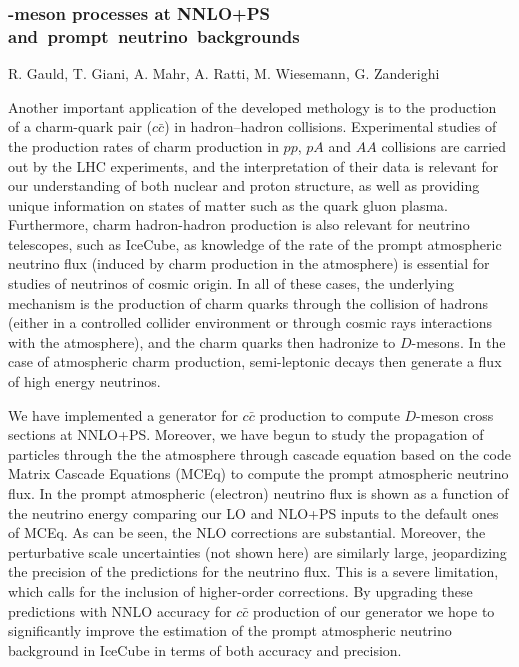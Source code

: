 \documentclass{FBR_Bericht_2025}
\begin{document}
\begin{refsection}
\subsubsection[$D$-meson processes at NNLO+PS and prompt neutrino backgrounds]{-meson processes at NNLO+PS \mbox{and prompt neutrino backgrounds}}
\begin{Namen}
R. Gauld, T. Giani, A. Mahr, A. Ratti, M. Wiesemann, G. Zanderighi
\end{Namen}

Another important application of the developed \minnlo{} methology is to the production
of a charm-quark pair ($c\bar c$) in hadron--hadron collisions. 
%
Experimental studies of the production rates of charm production in $pp$, $pA$ and $AA$ collisions are carried out by the LHC experiments, and the interpretation of their data is relevant for our understanding of both nuclear and proton structure, as well as providing unique information on states of matter such as the quark gluon plasma.
%
%
%
Furthermore, charm hadron-hadron production is also relevant for neutrino telescopes, such as IceCube, as knowledge of the rate of the prompt atmospheric neutrino flux (induced by charm production in the atmosphere) is essential for studies of neutrinos of cosmic origin.
%
In all of these cases, the underlying mechanism is the production of charm quarks through the collision
of hadrons (either in a controlled collider environment or through cosmic rays interactions 
with the atmosphere), and the charm quarks then hadronize to $D$-mesons. In the case of atmospheric charm production, 
semi-leptonic decays then generate a flux of high energy neutrinos. 

We have implemented a \minnlo{} generator for $c\bar c$ production to compute
$D$-meson cross sections at NNLO+PS. Moreover, we have begun to study 
the propagation of particles through the the atmosphere through cascade equation
based on the code Matrix Cascade Equations (MCEq) \cite{Fedynitch:2015zbe} to compute the prompt
atmospheric neutrino flux. In  the prompt atmospheric (electron) neutrino
flux is shown as a function of the neutrino energy comparing our LO and NLO+PS
inputs to the default ones of MCEq. As can be seen, the NLO corrections are substantial.
Moreover, the perturbative scale uncertainties (not shown here) are similarly large, 
jeopardizing the precision of the predictions for the neutrino flux. 
This is a severe limitation, which calls for the inclusion of higher-order corrections.
By upgrading these predictions with NNLO accuracy for $c\bar c$ production of 
our \minnlo{} generator we hope to significantly improve the estimation of the 
prompt atmospheric neutrino background in IceCube in terms of both accuracy and
precision.


\end{refsection}
\end{document}
